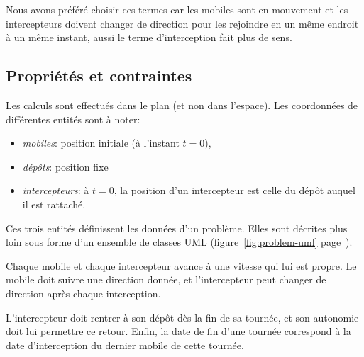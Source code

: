 			Nous avons préféré choisir ces termes car les mobiles sont en mouvement et les intercepteurs doivent changer de direction pour les rejoindre en un même endroit à un même instant, aussi le terme d'interception fait plus de sens.

		\subsection{Propriétés et contraintes}
			Les calculs sont effectués dans le plan (et non dans l'espace). Les coordonnées de différentes entités sont à noter:
			\begin{itemize}
				\item \emph{mobiles}: position initiale (à l'instant $t=0$),
				\item \emph{dépôts}: position fixe
				\item \emph{intercepteurs}: à $t=0$, la position d'un intercepteur est celle du dépôt auquel il est rattaché.
			\end{itemize}

			Ces trois entités définissent les données d'un problème. Elles sont décrites plus loin sous forme d'un ensemble de classes UML (figure~\ref{fig:problem-uml} page~\pageref{fig:problem-uml}).

			Chaque mobile et chaque intercepteur avance à une vitesse qui lui est propre. Le mobile doit suivre une direction donnée, et l'intercepteur peut changer de direction après chaque interception.

			L'intercepteur doit rentrer à son dépôt dès la fin de sa tournée, et son autonomie doit lui permettre ce retour. Enfin, la date de fin d'une tournée correspond à la date d'interception du dernier mobile de cette tournée.

